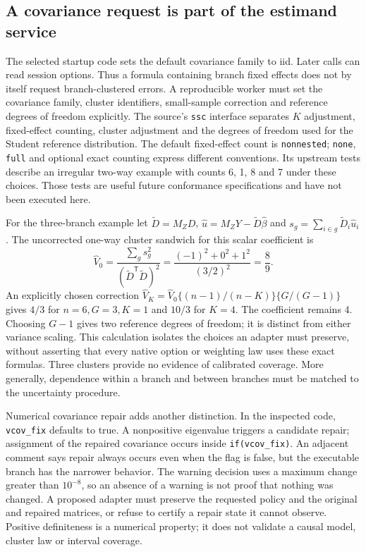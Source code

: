 \subsection{A covariance request is part of the estimand service}
\label{exec20:fx-covariance}
The selected startup code sets the default covariance family to iid. Later
calls can read session options. Thus a formula containing branch fixed effects
does not by itself request branch-clustered errors. A reproducible worker
must set the covariance family, cluster identifiers, small-sample correction
and reference degrees of freedom explicitly. The source's \texttt{ssc}
interface separates $K$ adjustment, fixed-effect counting, cluster adjustment
and the degrees of freedom used for the Student reference distribution.
The default fixed-effect count is \texttt{nonnested}; \texttt{none},
\texttt{full} and optional exact counting express different conventions.
Its upstream tests describe an irregular two-way example with counts 6, 1,
8 and 7 under these choices. Those tests are useful future conformance
specifications and have not been executed here.~\citep{exec20_fixest_source}

For the three-branch example let $\widetilde D=M_ZD$,
$\widehat u=M_ZY-\widetilde D\widehat\beta$ and
$s_g=\sum_{i\in g}\widetilde D_i\widehat u_i$. The uncorrected one-way
cluster sandwich for this scalar coefficient is
\begin{equation}
 \widehat V_0=\frac{\sum_gs_g^2}{(\widetilde D^{\mathsf T}\widetilde D)^2}
 =\frac{(-1)^2+0^2+1^2}{(3/2)^2}=\frac89.
 \label{exec20:fx-cluster}
\end{equation}
An explicitly chosen correction
$\widehat V_K=\widehat V_0\{(n-1)/(n-K)\}\{G/(G-1)\}$ gives
$4/3$ for $n=6,G=3,K=1$ and $10/3$ for $K=4$. The coefficient remains 4.
Choosing $G-1$ gives two reference degrees of freedom; it is distinct from
either variance scaling. This calculation isolates the choices an adapter
must preserve, without asserting that every native option or weighting law
uses these exact formulas. Three clusters provide no evidence of calibrated
coverage. More generally, dependence within a branch and between branches
must be matched to the uncertainty procedure.~\citep{exec20_fixest_reference}

Numerical covariance repair adds another distinction. In the inspected code,
\texttt{vcov\_fix} defaults to true. A nonpositive eigenvalue triggers a
candidate repair; assignment of the repaired covariance occurs inside
\texttt{if(vcov\_fix)}. An adjacent comment says repair always occurs even
when the flag is false, but the executable branch has the narrower behavior.
The warning decision uses a maximum change greater than $10^{-8}$, so an
absence of a warning is not proof that nothing was changed. A proposed
adapter must preserve the requested policy and the original and repaired
matrices, or refuse to certify a repair state it cannot observe. Positive
definiteness is a numerical property; it does not validate a causal model,
cluster law or interval coverage.~\citep{exec20_fixest_source}

